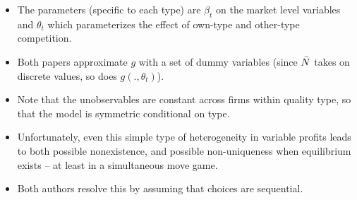 \documentclass[notes=show]{beamer}
\begin{document}
\begin{frame}%


\begin{itemize}
\item The parameters (specific to each type) are $\beta _{t}$ on the market
level variables and $\theta _{t}$ which parameterizes the effect of own-type
and other-type competition.

\item Both papers approximate $g$ with a set of dummy variables (since $\bar{%
N}$ takes on discrete values, so does $g(.,\theta _{t})$).

\item Note that the unobservables are constant across firms within quality
type, so that the model is symmetric conditional on type.

\item Unfortunately, even this simple type of heterogeneity in variable
profits leads to both possible nonexistence, and possible non-uniqueness
when equilibrium exists -- at least in a simultaneous move game.

\item Both authors resolve this by assuming that choices are sequential.
\end{itemize}

\end{frame}%
\end{document}
